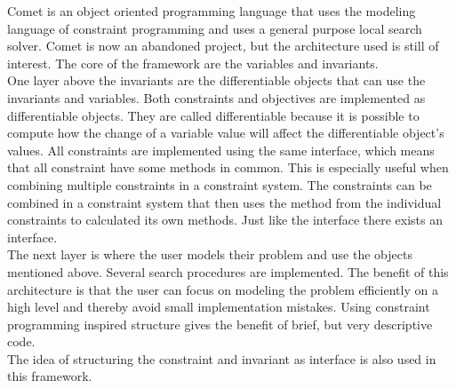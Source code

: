

Comet is an object oriented programming language that uses the modeling language of constraint programming and uses a 
general purpose local search solver. Comet is now an abandoned project, but the architecture used is still of interest. 
The core of the framework are the variables and invariants.
\medskip \\
One layer above the invariants are the differentiable objects that can use the invariants and variables. 
Both constraints and objectives are implemented as differentiable objects. They are called differentiable 
because it is possible to compute how the change of a variable value will affect the differentiable object's values. 
All constraints are implemented using the same interface, which means that all constraint have some methods in common. 
This is especially useful when combining multiple constraints in a constraint system. The constraints can be combined in 
a constraint system that then uses the method from the individual constraints to calculated its own methods. Just like 
the  interface there exists an  interface. \medskip \\ 
The next layer is where the user models their problem and use the objects mentioned above. Several search procedures 
are implemented. The benefit of this architecture is that the user can focus on modeling the problem 
efficiently on a high level and thereby avoid small implementation mistakes. Using constraint programming inspired 
structure gives the benefit of brief, but very descriptive code. \\ 
The idea of structuring the constraint and invariant as interface is also used in this framework. 



